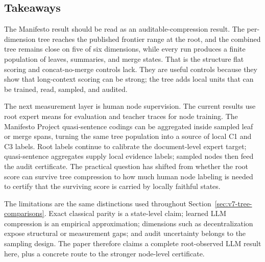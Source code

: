 \clearpage

\subsection{Takeaways}\label{sec:min-manifesto-takeaways}

The Manifesto result should be read as an auditable-compression result. The
per-dimension tree reaches the published frontier range at the root, and the
combined tree remains close on five of six dimensions, while every run
produces a finite population of leaves, summaries, and merge states. That is
the structure flat scoring and concat-no-merge controls lack. They are useful
controls because they show that long-context scoring can be strong; the tree
adds local units that can be trained, read, sampled, and audited.

The next measurement layer is human node supervision. The current results use
root expert means for evaluation and teacher traces for node training. The
Manifesto Project quasi-sentence codings can be aggregated inside sampled
leaf or merge spans, turning the same tree population into a source of local
C1 and C3 labels. Root labels continue to calibrate the document-level expert
target; quasi-sentence aggregates supply local evidence labels; sampled nodes
then feed the audit certificate. The practical question has shifted from
whether the root score can survive tree compression to how much human node
labeling is needed to certify that the surviving score is carried by locally
faithful states.

The limitations are the same distinctions used throughout
Section~\ref{sec:v7-tree-comparisons}. Exact classical parity is a
state-level claim; learned LLM compression is an empirical approximation;
dimensions such as decentralization expose structural or measurement gaps;
and audit uncertainty belongs to the sampling design. The paper therefore
claims a complete root-observed LLM result here, plus a concrete route to the
stronger node-level certificate.
